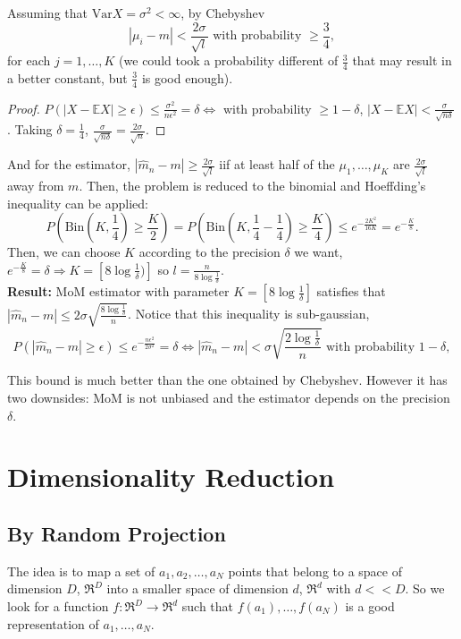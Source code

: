 \documentclass[11pt, english]{article}
\begin{document}
Assuming that $\text{Var}X=\sigma^2<\infty$, by Chebyshev 
\begin{equation}
	|\mu_i-m|< \frac{2\sigma}{\sqrt{l}}\text{ with probability }\geq \frac{3}{4},
\end{equation}
for each $j=1,\dots,K$ (we could took a probability different of $\frac{3}{4}$ that may result in a better constant, but $\frac{3}{4}$ is good enough). 
\begin{proof}
	$P(|X-\mathbb{E}X|\geq\epsilon)\leq\frac{\sigma^2}{n\epsilon^2}=\delta\Leftrightarrow$ with probability $\geq 1-\delta$, $|X-\mathbb{E}X|<\frac{\sigma}{\sqrt{n\delta}}$. Taking $\delta=\frac{1}{4}$, $\frac{\sigma}{\sqrt{n\delta}}=\frac{2\sigma}{\sqrt{n}}$.
\end{proof}
And for the estimator, $|\hat{m}_n-m|\geq \frac{2\sigma}{\sqrt{l}}$ iif at least half of the $\mu_1,\dots,\mu_K$ are $\frac{2\sigma}{\sqrt{l}}$ away from $m$. Then, the problem is reduced to the binomial and Hoeffding's inequality can be applied:
\begin{equation}
	P(\text{Bin}(K,\frac{1}{4})\geq \frac{K}{2})=P(\text{Bin}(K,\frac{1}{4}-\frac{1}{4})\geq \frac{K}{4})\leq e^{-\frac{2K^2}{16K}}=e^{-\frac{K}{8}}.
\end{equation} 
Then, we can choose $K$ according to the precision $\delta$ we want, $e^{-\frac{K}{8}}=\delta\Rightarrow K=[8\log\frac{1}{\delta})]$ so $l=\frac{n}{8\log\frac{1}{\delta}}$.\\

\textbf{Result:} MoM estimator with parameter $K=[8\log\frac{1}{\delta}]$ satisfies that $|\hat{m}_n-m|\leq 2\sigma\sqrt{\frac{8\log\frac{1}{\delta}}{n}}$. Notice that this inequality is sub-gaussian, 
\begin{equation}
	P(|\hat{m}_n-m|\geq\epsilon)\leq e^{-\frac{n\epsilon^2}{2\sigma^2}}=\delta\Leftrightarrow |\hat{m}_n-m|<\sigma\sqrt{\frac{2\log\frac{1}{\delta}}{n}}\text{ with probability }1-\delta,
\end{equation} 

This bound is much better than the one obtained by Chebyshev. However it has two downsides: MoM is not unbiased and the estimator depends on the precision $\delta$.


\section{Dimensionality Reduction}

\subsection{By Random Projection}
The idea is to map a set of $a_1,a_2,\dots,a_N$ points that belong to a space of dimension $D$, $\Re^D$ into a smaller space of dimension $d$, $\Re^d$ with $d<<D$. So we look for a function $f:\Re^D\rightarrow\Re^d$ such that $f(a_1),\dots,f(a_N)$ is a good representation of $a_1,\dots,a_N$. \\
\end{document}
